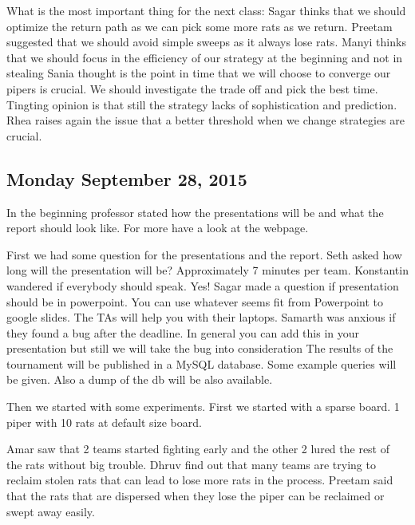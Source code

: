 What is the most important thing for the next class:
Sagar thinks that we should optimize the return path as we can pick some more rats 
as we return.
Preetam suggested that we should avoid simple sweeps as it always lose rats.
Manyi thinks that we should focus in the efficiency of our strategy at the beginning 
and not in stealing
Sania thought is the point in time that we will choose to converge our pipers is 
crucial. We should investigate the trade off and pick the best time. 
Tingting opinion is that still the strategy lacks of sophistication and prediction.
Rhea raises again the issue that a better threshold when we change strategies are crucial.

\subsection{Monday September 28, 2015}
In the beginning professor stated how the presentations will be and what the report should look like.  For more have a look at the webpage.

First we had some question for the presentations and the report. 
Seth asked how long will the presentation will be?
Approximately 7 minutes per team.
Konstantin wandered if everybody should speak. Yes!
Sagar made a question if presentation should be in powerpoint.
You can use whatever seems fit from Powerpoint to google slides.
The TAs will help you with their laptops. 
Samarth was anxious if they found a bug after the deadline.
In general you can add this in your presentation but still we will take the bug 
into consideration
The results of the tournament will be published in a MySQL database. Some example 
queries will be given. Also a dump of the db will be also available.

Then we started with some experiments. First we started with a sparse board. 1 
piper with 10 rats at default size board.

Amar saw that 2 teams started fighting early and the other 2 lured the rest of 
the rats without big trouble.
Dhruv find out that many teams are trying to reclaim stolen rats that can lead 
to lose more rats in the process.
Preetam said that the rats that are dispersed when they lose the piper can be 
reclaimed or swept away easily.

